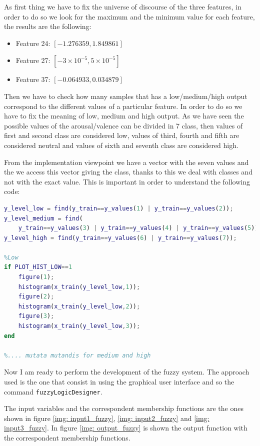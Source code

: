 \documentclass[a4paper]{report}
\begin{document}
	
	\noindent As first thing we have to fix the universe of discourse of the three features, in order to do so we look for the maximum and the minimum value for each feature, the results are the following:
	\begin{itemize}
		\item Feature 24: $[-1.276359,1.849861]$
 		\item Feature 27: $[-3 \times 10^{-5}, 5 \times 10^{-5}]$
		\item Feature 37: $[-0.064933, 0.034879]$
	\end{itemize}
	
	\noindent Then we have to check how many samples that has a low/medium/high output correspond to the different values of a particular feature. In order to do so we have to fix the meaning of low, medium and high output. As we have seen the possible values of the arousal/valence can be divided in 7 class, then values of first and second class are considered low, values of third, fourth and fifth are considered neutral and values of sixth and seventh class are considered high.
	
	\noindent From the implementation viewpoint we have a vector with the seven values and the we access this vector giving the class, thanks to this we deal with classes and not with the exact value. This is important in order to understand the following code:
	\begin{lstlisting}[language=Matlab]
y_level_low = find(y_train==y_values(1) | y_train==y_values(2));
y_level_medium = find(
	y_train==y_values(3) | y_train==y_values(4) | y_train==y_values(5));
y_level_high = find(y_train==y_values(6) | y_train==y_values(7));
		
%Low
if PLOT_HIST_LOW==1
	figure(1);
	histogram(x_train(y_level_low,1));
	figure(2);
	histogram(x_train(y_level_low,2));
	figure(3);
	histogram(x_train(y_level_low,3));
end
		
%.... mutata mutandis for medium and high
	\end{lstlisting}
	
	\noindent Now I am ready to perform the development of the fuzzy system. The approach used is the one that consist in using the graphical user interface and so the command \texttt{fuzzyLogicDesigner}.
	
	\noindent The input variables and the correspondent membership functions are the ones shown in figure \ref{img: input1_fuzzy}, \ref{img: input2_fuzzy} and \ref{img: input3_fuzzy}. In figure \ref{img: output_fuzzy} is shown the output function with the correspondent membership functions.
	
\end{document}
